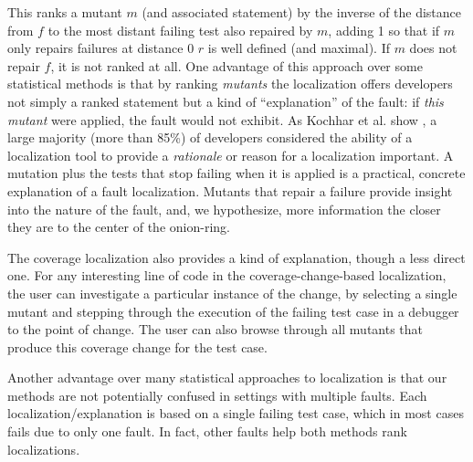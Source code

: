 This ranks a mutant $m$ (and associated statement) by the inverse of the distance
from $f$ to the most distant failing test also repaired by $m$, adding 1
so that if $m$ only repairs failures at distance 0 $r$ is well defined
(and maximal).
If $m$ does not repair $f$, it is not ranked at all.  One advantage of
this approach over some statistical methods is that by
ranking \emph{mutants} the localization offers developers not simply a
ranked statement but a kind of ``explanation'' \cite{GroceError} of the fault:  if \emph{this
mutant} were applied, the fault would not exhibit.  As Kochhar et
al. show \cite{Kochhar}, a large majority (more than 85\%) of developers considered
the ability of a localization tool to provide a \emph{rationale} or
reason for a localization important.  A mutation plus the tests that
stop failing when it is applied is a practical, concrete explanation
of a fault localization.  Mutants that repair a failure provide insight 
into the nature of the fault, and, we hypothesize, more information the 
closer they are to the center of the onion-ring. 

The coverage localization also provides a kind of explanation, though
a less direct one.  For any
interesting line of code in the coverage-change-based localization,
the user can investigate a particular instance of the change,
by selecting a single mutant and stepping through the execution of the
failing test case in a debugger to the point of change.  The user can also
browse through all mutants that produce this coverage change for the test
case.  

Another advantage over many statistical approaches to
localization is that our methods are not potentially confused in
settings with multiple faults.  Each localization/explanation is based
on a single failing test case, which in most cases fails due to only one
fault.  In fact, other faults help both methods rank localizations.